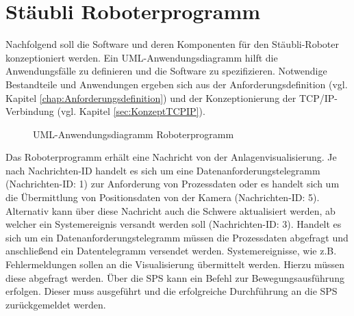 \documentclass[ a4paper,
                oneside,
                toc=bibliography,
                toc=listof
                ]{scrbook}
\begin{document}
	\section{Stäubli Roboterprogramm}
	\label{sec:KonzeptVAL3}
	Nachfolgend soll die Software und deren Komponenten für den Stäubli-Roboter konzeptioniert werden. Ein UML-Anwendungsdiagramm hilft die Anwendungsfälle zu definieren und die Software zu spezifizieren. Notwendige Bestandteile und Anwendungen ergeben sich aus der Anforderungsdefinition (vgl. Kapitel \ref{chap:Anforderungsdefinition}) und der Konzeptionierung der TCP/IP-Verbindung (vgl. Kapitel \ref{sec:KonzeptTCPIP}).
	\begin{figure}[h!]
		\centering
		\caption{UML-Anwendungsdiagramm Roboterprogramm}
		\label{fig:UML_Use_Case_Robo}
	\end{figure}
	Das Roboterprogramm erhält eine Nachricht von der Anlagenvisualisierung. Je nach Nachrichten-ID handelt es sich um eine Datenanforderungstelegramm (Nachrichten-ID: 1) zur Anforderung von Prozessdaten oder es handelt sich um die Übermittlung von Positionsdaten von der Kamera (Nachrichten-ID: 5). Alternativ kann über diese Nachricht auch die Schwere aktualisiert werden, ab welcher ein Systemereignis versandt werden soll (Nachrichten-ID: 3). Handelt es sich um ein Datenanforderungstelegramm müssen die Prozessdaten abgefragt und anschließend ein Datentelegramm versendet werden. Systemereignisse, wie z.B. Fehlermeldungen sollen an die Visualisierung übermittelt werden. Hierzu müssen diese abgefragt werden. Über die SPS kann ein Befehl zur Bewegungsausführung erfolgen. Dieser muss ausgeführt und die erfolgreiche Durchführung an die SPS zurückgemeldet werden.\\
\end{document}

